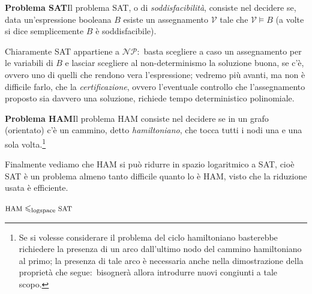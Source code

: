 \vspace{12pt}
\noindent \textbf{Problema SAT}\quad Il problema {\footnotesize SAT}, o di \textit{soddisfacibilità}, consiste nel decidere se, data un'espressione booleana $B$ esiste un assegnamento $\mathcal{V}$ tale che $\mathcal{V} \vDash B$ (a volte si dice semplicemente $B$ è soddisfacibile).

\medskip
\noindent Chiaramente {\footnotesize SAT} appartiene a $\mathcal{NP}$:\ basta scegliere a caso un assegnamento per le variabili di $B$ e lasciar scegliere al non-determinismo la soluzione buona, se c'è, ovvero uno di quelli che rendono vera l'espressione; vedremo più avanti, ma non è difficile farlo, che la \textit{certificazione}, ovvero l'eventuale controllo che l'assegnamento proposto sia davvero una soluzione, richiede tempo deterministico polinomiale.

\vspace{12pt}
\noindent\textbf{Problema HAM}\quad Il problema {\footnotesize HAM} consiste nel decidere se in un grafo (orientato) c'è un cammino, detto \textit{hamiltoniano}, che tocca tutti i nodi una e una sola volta.\footnote{Se si volesse considerare il problema del ciclo hamiltoniano basterebbe richiedere la presenza di un arco dall'ultimo nodo del cammino hamiltoniano al primo; la presenza di tale arco è necessaria anche nella dimostrazione della proprietà che segue:\ bisognerà allora introdurre nuovi congiunti a tale scopo.}

\medskip
\noindent Finalmente vediamo che {\footnotesize HAM} si può ridurre in spazio logaritmico a {\footnotesize SAT}, cioè {\footnotesize SAT} è un problema almeno tanto difficile quanto lo è {\footnotesize HAM}, visto che la riduzione usata è efficiente.

\begin{property}
    $\mbox{\footnotesize HAM} \leqslant_{\mathrm{logspace}} \mbox{\footnotesize SAT}$
\end{property}

